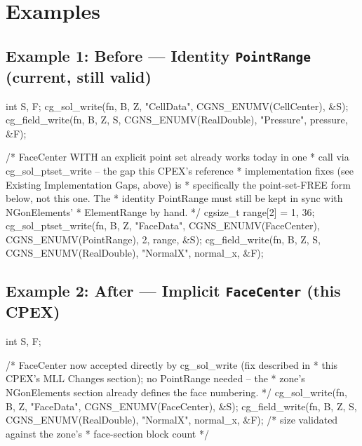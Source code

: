 \documentclass[11pt,letterpaper]{article}
\makeatletter
\let\cgns@orig@lstlisting\lstlisting
\let\cgns@endorig@lstlisting\endlstlisting
\renewenvironment{lstlisting}
  {\par\needspace{5\baselineskip}\nolinenumbers\cgns@orig@lstlisting}
  {\cgns@endorig@lstlisting\par\linenumbers}
\makeatother
\begin{document}
\section{Examples}
\label{sec:examples}

\subsection{Example 1: Before --- Identity \texttt{PointRange} (current, still valid)}
\label{sec:example1}

\begin{lstlisting}[language=C]
int S, F;
cg_sol_write(fn, B, Z, "CellData", CGNS_ENUMV(CellCenter), &S);
cg_field_write(fn, B, Z, S, CGNS_ENUMV(RealDouble), "Pressure",
               pressure, &F);

/* FaceCenter WITH an explicit point set already works today in one
 * call via cg_sol_ptset_write -- the gap this CPEX's reference
 * implementation fixes (see Existing Implementation Gaps, above) is
 * specifically the point-set-FREE form below, not this one. The
 * identity PointRange must still be kept in sync with NGonElements'
 * ElementRange by hand. */
cgsize_t range[2] = {1, 36};
cg_sol_ptset_write(fn, B, Z, "FaceData", CGNS_ENUMV(FaceCenter),
                   CGNS_ENUMV(PointRange), 2, range, &S);
cg_field_write(fn, B, Z, S, CGNS_ENUMV(RealDouble), "NormalX",
               normal_x, &F);
\end{lstlisting}

\subsection{Example 2: After --- Implicit \texttt{FaceCenter} (this CPEX)}
\label{sec:example2}

\begin{lstlisting}[language=C]
int S, F;

/* FaceCenter now accepted directly by cg_sol_write (fix described in
 * this CPEX's MLL Changes section); no PointRange needed -- the
 * zone's NGonElements section already defines the face numbering. */
cg_sol_write(fn, B, Z, "FaceData", CGNS_ENUMV(FaceCenter), &S);
cg_field_write(fn, B, Z, S, CGNS_ENUMV(RealDouble), "NormalX",
               normal_x, &F);   /* size validated against the zone's
                                 * face-section block count */
\end{lstlisting}
\end{document}
